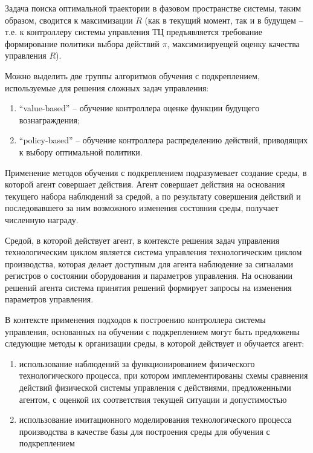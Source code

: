 Задача поиска оптимальной траектории в фазовом пространстве системы, таким образом, сводится к максимизации $R$ (как в текущий момент, так и в будущем – т.е. к контроллеру системы управления ТЦ предъявляется требование формирование политики выбора действий $\pi$, максимизируещей оценку качества управления $R$).

Можно выделить две группы алгоритмов обучения с подкреплением, используемые для решения сложных задач управления:

\begin{enumerate}
    \item ``value-based'' – обучение контроллера оценке функции будущего вознаграждения;
    \item ``policy-based'' – обучение контроллера распределению действий, приводящих к выбору оптимальной политики.
\end{enumerate}


Применение методов обучения с подкреплением подразумевает создание среды, в которой агент совершает действия. Агент совершает действия на основания текущего набора наблюдений за средой, а по результату совершения действий и последовавшего за ним возможного изменения состояния среды, получает численную награду.


Средой, в которой действует агент, в контексте решения задач управления технологическим циклом является система управления технологическим циклом производства, которая делает доступным для агента наблюдение за сигналами регистров о состоянии оборудования и параметров управления. На основании решений агента система принятия решений формирует запросы на изменения параметров управления.


В контексте применения подходов к построению контроллера системы управления, основанных на обучении с подкреплением могут быть предложены следующие методы к организации среды, в которой действует и обучается агент:

\begin{enumerate}
    \item использование наблюдений за функционированием физического технологического процесса, при котором имплементированы схемы сравнения действий физической системы управления с действиями, предложенными агентом, с оценкой их соответствия текущей ситуации и допустимостью
    \item использование имитационного моделирования технологического процесса производства в качестве базы для построения среды для обучения с подкреплением
\end{enumerate}



